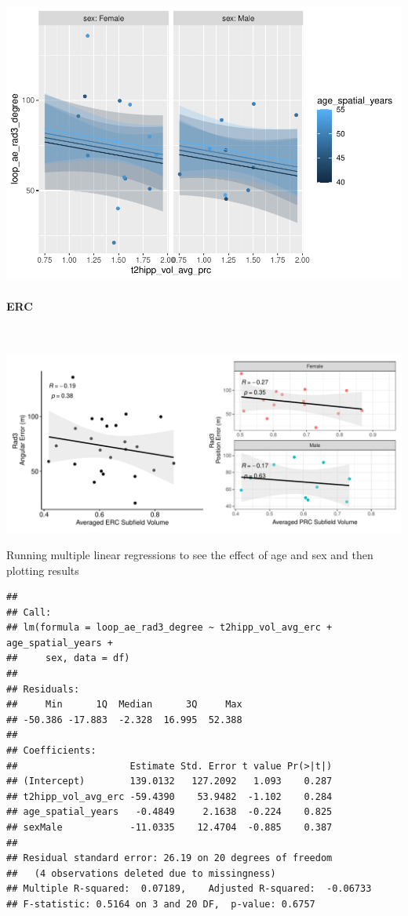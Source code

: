 \documentclass[
]{article}
\begin{document}
\includegraphics{hippocampal_subfield_files/figure-latex/Avg PRC + rad3 angular errorMLR-1.pdf}
\vspace{1cm}

\paragraph{ERC}

~ \vspace{1cm}

\includegraphics{hippocampal_subfield_files/figure-latex/unnamed-chunk-13-1.pdf}

\vspace{1cm}

Running multiple linear regressions to see the effect of age and sex and
then plotting results

\begin{verbatim}
## 
## Call:
## lm(formula = loop_ae_rad3_degree ~ t2hipp_vol_avg_erc + age_spatial_years + 
##     sex, data = df)
## 
## Residuals:
##     Min      1Q  Median      3Q     Max 
## -50.386 -17.883  -2.328  16.995  52.388 
## 
## Coefficients:
##                    Estimate Std. Error t value Pr(>|t|)
## (Intercept)        139.0132   127.2092   1.093    0.287
## t2hipp_vol_avg_erc -59.4390    53.9482  -1.102    0.284
## age_spatial_years   -0.4849     2.1638  -0.224    0.825
## sexMale            -11.0335    12.4704  -0.885    0.387
## 
## Residual standard error: 26.19 on 20 degrees of freedom
##   (4 observations deleted due to missingness)
## Multiple R-squared:  0.07189,    Adjusted R-squared:  -0.06733 
## F-statistic: 0.5164 on 3 and 20 DF,  p-value: 0.6757
\end{verbatim}
\end{document}
